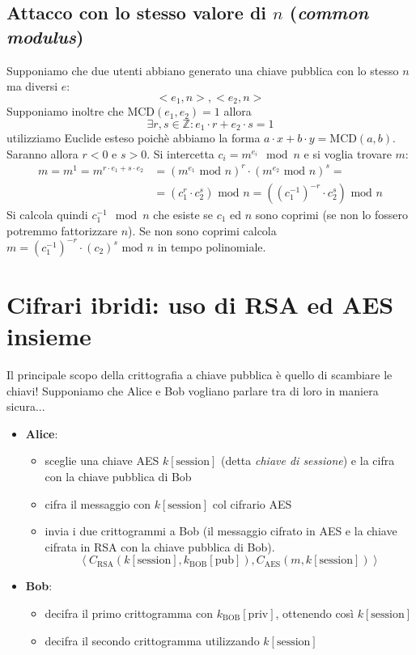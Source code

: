 \subsection{Attacco con lo stesso valore di $n$ (\emph{common modulus})}
Supponiamo che due utenti abbiano generato una chiave pubblica con lo stesso $n$ ma diversi $e$:
$$ <e_1,n>, <e_2,n> $$
Supponiamo inoltre che $\text{MCD}(e_1, e_2) = 1$ allora $$\exists r,s \in \mathbb{Z}: e_1 \cdot r + e_2 \cdot s = 1$$ utilizziamo Euclide esteso poichè abbiamo la forma $a\cdot x +b\cdot y = \text{MCD}(a,b)$. Saranno allora $r<0$ e $s>0$. Si intercetta $c_i = m^{e_i} \mod n$ e si voglia trovare $m$:
\begin{align*}
	m = m^1 = m^{r \cdot e_1 + s \cdot e_2 } &= (m^{e_1} \text{ mod } n)^{r} \cdot (m^{e_2} \text{ mod } n)^{s} =\\
	&= (c_1^r \cdot c_2^s) \text{ mod } n = ((c_1^{-1})^{-r} \cdot c_2^s) \text{ mod } n\textbf{}
\end{align*}
Si calcola quindi $c_1^{-1} \mod n$ che esiste se $c_1$ ed $n$ sono coprimi (se non lo fossero potremmo fattorizzare $n$). Se non sono coprimi calcola $m = (c_1^{-1})^{-r} \cdot (c_2)^{s} \text{ mod } n$ in tempo polinomiale.

\section{Cifrari ibridi: uso di RSA ed AES insieme}
Il principale scopo della crittografia a chiave pubblica è quello di scambiare le chiavi! Supponiamo che Alice e Bob vogliano parlare tra di loro in maniera sicura...
\begin{itemize}
    \item \textbf{Alice}: 
    \begin{itemize}
        \item sceglie una chiave AES $k[\text{session}]$  (detta \emph{chiave di sessione}) e la cifra con la chiave pubblica di Bob
        \item cifra il messaggio con $k[\text{session}]$ col cifrario AES
        \item invia i due crittogrammi a Bob (il messaggio cifrato in AES e la chiave cifrata in RSA con la chiave pubblica di Bob).
        $$\left<C_{\text{RSA}}(k[\text{session}], k_{\text{BOB}}[\text{pub}]), C_{\text{AES}}(m, k[\text{session}])\right>$$
    \end{itemize}
    \item \textbf{Bob}:
    \begin{itemize}
    	\item decifra il primo crittogramma con  $k_{\text{BOB}}[\text{priv}]$, ottenendo così $k[\text{session}]$
    	\item decifra il secondo crittogramma utilizzando $k[\text{session}]$
    \end{itemize} 
\end{itemize}

